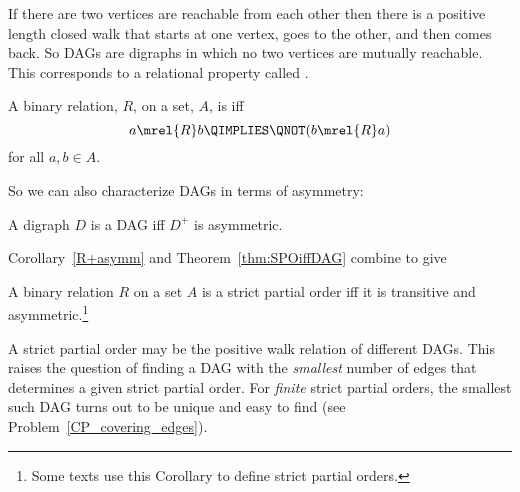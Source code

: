 If there are two vertices are reachable from each other then there is
a positive length closed walk that starts at one vertex, goes to the
other, and then comes back.  So DAGs are digraphs in which no two
vertices are mutually reachable.  This corresponds to a relational
property called .

\begin{definition}
A binary relation, $R$, on a set, $A$, is  iff
\[
a \mrel{R} b \QIMPLIES \QNOT(b \mrel{R} a)
\]
for all $a,b \in A$.
\end{definition}
So we can also characterize DAGs in terms of asymmetry:
\begin{corollary}\label{R+asymm}
A digraph $D$ is a DAG iff $D^+$ is asymmetric.
\end{corollary}

Corollary~\ref{R+asymm} and Theorem~\ref{thm:SPOiffDAG} combine to give
\begin{corollary}\label{cor:spoifftransasym}
A binary relation $R$ on a set $A$ is a strict partial order iff it is
transitive and asymmetric.\footnote{Some texts use this Corollary to
  define strict partial orders.}
\end{corollary}

\iffalse
can be an economical way to represent partial orders.  For example,
the \emph{direct prerequisite} relation between MIT subjects in
Chapter~\ref{partial-order-chapter} was used to determine the partial
order of indirect prerequisites on subjects.  This indirect
prerequisite partial order is precisely the positive length walk
relation of the direct prerequisites.
\fi

A strict partial order may be the positive walk relation of different
DAGs.  \iffalse The divisibility partial order can also be more
economically represented by the walk relation in a DAG.
\hyperdef{divisibility}{DAG}{A DAG whose \emph{path} relation is
  divisibility} on $\set{1,2,\dots,12}$ is shown in
Figure~\ref{fig:divisibility-DAG}; the arrowheads are omitted in the
Figure, and edges are understood to point upwards.

\begin{figure}
\graphic{divi2}
\caption{A DAG whose Walk Relation is Divisibility on $\set{1,2,\dots,12}$.}
\label{fig:divisibility-DAG}
\end{figure}

If we're using a DAG to represent a partial order---so all we care
about is the the walk relation of the DAG---we could replace the DAG
with any other DAG with the same walk relation.  \fi
This raises the question of finding a DAG with the \emph{smallest}
number of edges that determines a given strict partial order.  For
\emph{finite} strict partial orders, the smallest such DAG turns out
to be unique and easy to find (see Problem~\ref{CP_covering_edges}).

